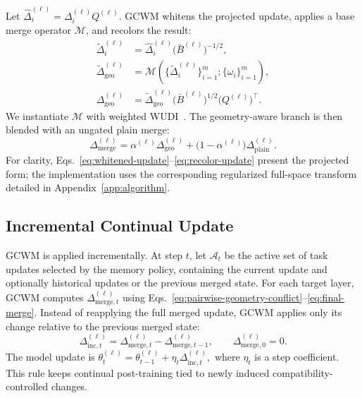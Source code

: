 \documentclass{article}
\begin{document}
Let
\(\hat{\Delta}_i^{(\ell)}=\Delta_i^{(\ell)}Q^{(\ell)}\).
GCWM whitens the projected update, applies a base merge operator \(\mathcal{M}\), and recolors the result:
\begin{align}
\tilde{\Delta}_i^{(\ell)}
&=
\hat{\Delta}_i^{(\ell)}
\big(\bar{B}^{(\ell)}\big)^{-1/2},
\label{eq:whitened-update}
\\
\tilde{\Delta}_{\mathrm{geo}}^{(\ell)}
&=
\mathcal{M}\!\left(
\{\tilde{\Delta}_i^{(\ell)}\}_{i=1}^m;
\{\omega_i\}_{i=1}^m
\right),
\nonumber
\\
\Delta_{\mathrm{geo}}^{(\ell)}
&=
\tilde{\Delta}_{\mathrm{geo}}^{(\ell)}
\big(\bar{B}^{(\ell)}\big)^{1/2}
\big(Q^{(\ell)}\big)^\top .
\label{eq:recolor-update}
\end{align}
We instantiate \(\mathcal{M}\) with weighted WUDI~\cite{cheng2025whoever}. The geometry-aware branch is then blended with an ungated plain merge:
\begin{equation}
\Delta_{\mathrm{merge}}^{(\ell)}
=
\alpha^{(\ell)}\Delta_{\mathrm{geo}}^{(\ell)}
+
\big(1-\alpha^{(\ell)}\big)\Delta_{\mathrm{plain}}^{(\ell)} .
\label{eq:final-merge}
\end{equation}
For clarity, Eqs.~\eqref{eq:whitened-update}--\eqref{eq:recolor-update} present the projected form; the implementation uses the corresponding regularized full-space transform detailed in Appendix~\ref{app:algorithm}.

\subsection{Incremental Continual Update}

GCWM is applied incrementally. At step \(t\), let \(\mathcal{A}_t\) be the active set of task updates selected by the memory policy, containing the current update and optionally historical updates or the previous merged state.
For each target layer, GCWM computes \(\Delta_{\mathrm{merge},t}^{(\ell)}\) using Eqs.~\eqref{eq:pairwise-geometry-conflict}--\eqref{eq:final-merge}.
Instead of reapplying the full merged update, GCWM applies only its change relative to the previous merged state:
\begin{equation}
\Delta_{\mathrm{inc},t}^{(\ell)}
=
\Delta_{\mathrm{merge},t}^{(\ell)}
-
\Delta_{\mathrm{merge},t-1}^{(\ell)},
\qquad
\Delta_{\mathrm{merge},0}^{(\ell)}=0 .
\label{eq:incremental-merge}
\end{equation}
The model update is \quad
$\theta_t^{(\ell)}
=
\theta_{t-1}^{(\ell)}
+
\eta_t\Delta_{\mathrm{inc},t}^{(\ell)},$ \quad
where \(\eta_t\) is a step coefficient. This rule keeps continual post-training tied to newly induced compatibility-controlled changes.
\end{document}
